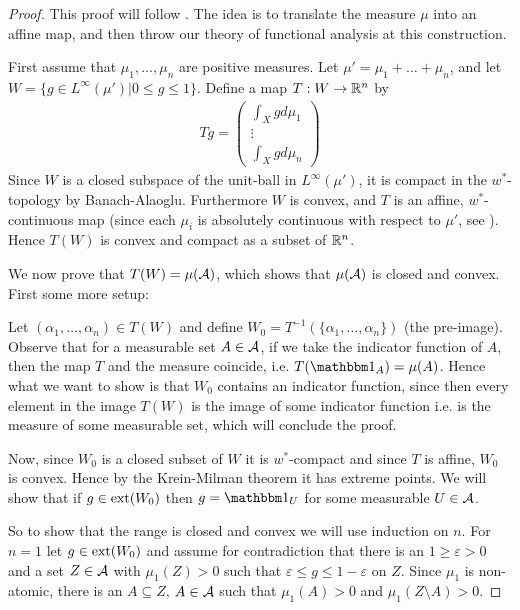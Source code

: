 \begin{proof}
This proof will follow \cite{Lindenstrauss66}. The idea is to translate the measure $\mu$ into an affine map, and then throw our theory of functional analysis at this construction.

First assume that $\mu_{1}, \dots, \mu_{n}$ are positive measures.
Let $\mu'=\mu_{1}+\dots+\mu_{n}$, and let $W=\{g \in L^{\infty}(\mu') | 0 \le g \le 1 \}$. Define a map $T:W \to \mathbb{R}^{n}$ by
\begin{align*}
	Tg=\begin{pmatrix}
		\int_{X} g d\mu_{1} \\
		\vdots \\
		\int_{X} g d\mu_{n}
	\end{pmatrix}
\end{align*}
Since $W$ is a closed subspace of the unit-ball in $L^{\infty}(\mu')$, it is compact in the $w^{*}$-topology by Banach-Alaoglu. Furthermore $W$ is convex, and $T$ is an affine, $w^{*}$-continuous map (since each $\mu_{i}$ is absolutely continuous with respect to $\mu'$, see ). Hence $T(W)$ is convex and compact as a subset of $\mathbb{R}^{n}$.


We now prove that $T(W)=\mu(\mathcal{A})$, which shows that $\mu(\mathcal{A})$ is closed and convex. First some more setup:

Let $(\alpha_{1}, \dots, \alpha_{n})\in T(W)$ and define $W_{0}=T^{-1}(\{\alpha_{1}, \dots, \alpha_{n}\})$ (the pre-image). 
Observe that for a measurable set $A\in \mathcal{A}$, if we take the indicator function of $A$, then the map $T$ and the measure coincide, i.e. $T(\ind{A})=\mu(A)$. Hence what we want to show is that $W_{0}$ contains an indicator function, since then every element in the image $T(W)$ is the image of some indicator function i.e. is the measure of some measurable set, which will conclude the proof. 

Now, since $W_{0}$ is a closed subset of $W$ it is $w^{*}$-compact and since $T$ is affine, $W_{0}$ is convex. Hence by the Krein-Milman theorem it has extreme points. We will show that if $g\in \operatorname{ext}(W_{0})$ then $g=\ind{U}$ for some measurable $U\in \mathcal{A}$.

So to show that the range is closed and convex we will use induction on $n$. For $n=1$ let $g\in \operatorname{ext}(W_{0})$ and assume for contradiction that there is an $1 \ge \varepsilon > 0$ and a set $Z\in \mathcal{A}$ with $\mu_{1}(Z)>0$ such that $\varepsilon \le g \le 1-\varepsilon$ on $Z$. Since $\mu_{1}$ is non-atomic, there is an $A\subseteq Z$, $A\in \mathcal{A}$ such that $\mu_{1}(A)>0$ and $\mu_{1}(Z\setminus A)>0$. 


\end{proof}
